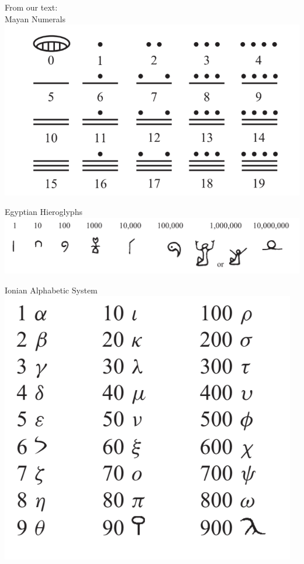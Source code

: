 \documentclass[12pt]{article}
\begin{document}
From our text:\\

Mayan Numerals\\


\includegraphics[scale=.6]{mayan}

\vfill

Egyptian Hieroglyphs\\

\includegraphics[scale=.6]{hieroglyphs}

\vfill

Ionian Alphabetic System\\

\includegraphics[scale=.7]{alphabetic}
\end{document}
